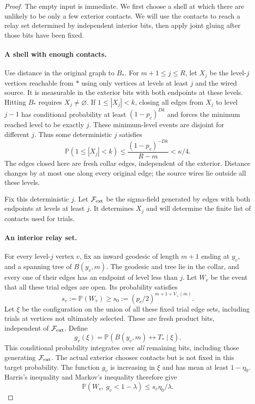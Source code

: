 \documentclass[11pt]{article}
\theoremstyle{definition}
\begin{document}
\begin{proof}
The empty input is immediate. We first choose a shell at which there
are unlikely to be only a few exterior contacts. We will use the
contacts to reach a relay set determined by independent interior bits,
then apply joint gluing after those bits have been fixed.

\paragraph{A shell with enough contacts.}
Use distance in the original graph to
$B_*$. For $m+1\le j\le R$, let $X_j$ be the level-$j$ vertices
reachable from $*$ using only vertices at levels at least $j$ and
the wired source. It is measurable in the exterior bits with both
endpoints at these levels. Hitting $B_*$ requires $X_j\ne\varnothing$.
If $1\le|X_j|<k$, closing all edges from $X_j$ to level $j-1$
has conditional probability at least $(1-p_c)^{Dk}$ and forces the
minimum reached level to be exactly $j$. These minimum-level events
are disjoint for different $j$. Thus some deterministic $j$ satisfies
\begin{equation}\label{eq:few-contacts}
 \mathbb P(1\le|X_j|<k)
 \le\frac{(1-p_c)^{-Dk}}{R-m}<\kappa/4.
\end{equation}
The edges closed here are fresh collar edges, independent of the
exterior. Distance changes by at most one along every original edge;
the source wires lie outside all these levels.

Fix this deterministic $j$. Let $\mathcal F_{\rm ext}$ be the
sigma-field generated by edges with both endpoints at levels at least
$j$. It determines $X_j$ and will determine the finite list of contacts
used for trials.

\paragraph{An interior relay set.}
For every level-$j$ vertex $v$, fix an inward geodesic of length
$m+1$ ending at $y_v$, and a spanning tree of $B(y_v,m)$. The geodesic
and tree lie in the collar, and every one of their edges has an
endpoint of level less than $j$. Let $W_v$ be the event that all
these trial edges are open. Its probability satisfies
\[
 s_v:=\mathbb P(W_v)\ge s_0:=(p_c/2)^{m+1+V_+(m)}.
\]
Let $\xi$ be the configuration on the union of all these fixed trial
edge sets, including trials at vertices not ultimately selected.
These are fresh product bits, independent of $\mathcal F_{\rm ext}$.
Define
\[
 g_v(\xi)=\mathbb P(B(y_v,m)\leftrightarrow T_*\mid\xi).
\]
This conditional probability integrates over \emph{all} remaining
bits, including those generating $\mathcal F_{\rm ext}$. The actual
exterior chooses contacts but is not fixed in this target probability.
The function $g_v$ is increasing in $\xi$ and has
mean at least $1-\eta_0$. Harris's inequality and Markov's inequality
therefore give
\begin{equation}\label{eq:good-trial}
 \mathbb P(W_v,\ g_v<1-\lambda)\le s_v\eta_0/\lambda.
\end{equation}


\end{proof}
\end{document}
